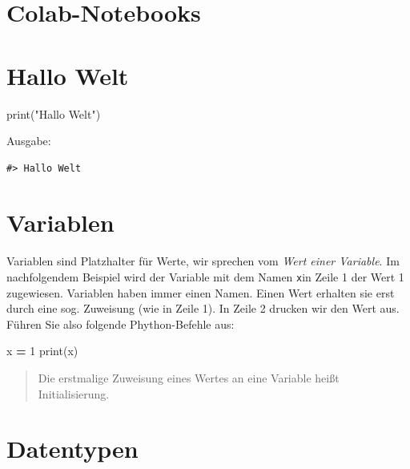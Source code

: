 \documentclass[
  oneside]{book}
\newenvironment{Shaded}{\begin{snugshade}}{\end{snugshade}}
\newcommand{\BuiltInTok}[1]{#1}
\newcommand{\DecValTok}[1]{\textcolor[rgb]{0.00,0.00,0.81}{#1}}
\newcommand{\NormalTok}[1]{#1}
\newcommand{\OperatorTok}[1]{\textcolor[rgb]{0.81,0.36,0.00}{\textbf{#1}}}
\newcommand{\StringTok}[1]{\textcolor[rgb]{0.31,0.60,0.02}{#1}}
\begin{document}
\hypertarget{colab-notebooks}{%
\section{Colab-Notebooks}\label{colab-notebooks}}

\hypertarget{hallo-welt}{%
\section{Hallo Welt}\label{hallo-welt}}

\begin{Shaded}
\begin{Highlighting}[]
\BuiltInTok{print}\NormalTok{(}\StringTok{"Hallo Welt"}\NormalTok{)}
\end{Highlighting}
\end{Shaded}

Ausgabe:

\begin{verbatim}
#> Hallo Welt
\end{verbatim}

\hypertarget{variablen}{%
\section{Variablen}\label{variablen}}

Variablen sind Platzhalter für Werte, wir sprechen vom \emph{Wert einer Variable}. Im nachfolgendem Beispiel wird der Variable mit dem Namen \texttt{x}in Zeile 1 der Wert 1 zugewiesen. Variablen haben immer einen Namen. Einen Wert erhalten sie erst durch eine sog. Zuweisung (wie in Zeile 1). In Zeile 2 drucken wir den Wert aus. Führen Sie also folgende Phython-Befehle aus:

\begin{Shaded}
\begin{Highlighting}[]
\NormalTok{x }\OperatorTok{=} \DecValTok{1}
\BuiltInTok{print}\NormalTok{(x)}
\end{Highlighting}
\end{Shaded}

\begin{quote}
Die erstmalige Zuweisung eines Wertes an eine Variable heißt Initialisierung.
\end{quote}

\hypertarget{datentypen}{%
\section{Datentypen}\label{datentypen}}
\end{document}
